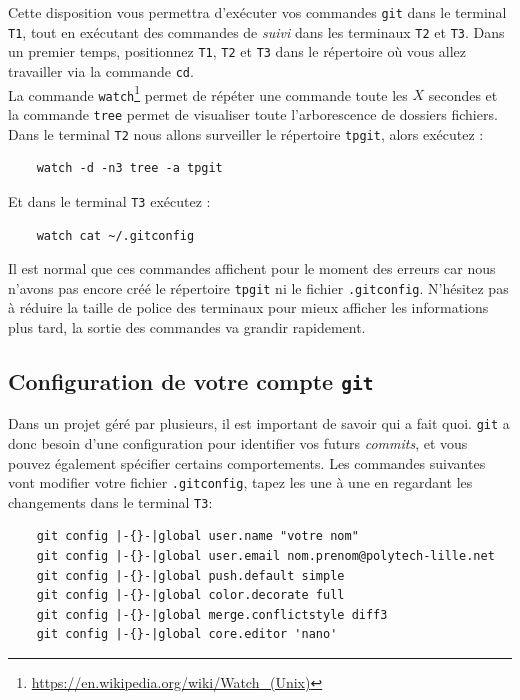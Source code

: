 \documentclass[final, a4paper, openbib, ]{article}
\begin{document}
Cette disposition vous permettra d'exécuter vos commandes \texttt{git} dans le terminal \texttt{T1}, tout en exécutant des commandes de \textit{suivi} dans les terminaux \texttt{T2} et \texttt{T3}.
Dans un premier temps, positionnez \texttt{T1}, \texttt{T2} et \texttt{T3} dans le répertoire où vous allez travailler via la commande \texttt{cd}.\\

La commande \texttt{watch}\footnote{\url{https://en.wikipedia.org/wiki/Watch\_(Unix)}} permet de répéter une commande toute les $X$ secondes et la commande \texttt{tree} permet de visualiser toute l'arborescence de dossiers fichiers. Dans le terminal \texttt{T2} nous allons surveiller le répertoire \texttt{tpgit}, alors exécutez :
\begin{verbatim}
	watch -d -n3 tree -a tpgit
\end{verbatim}

Et dans le terminal \texttt{T3} exécutez :
\begin{verbatim}
	watch cat ~/.gitconfig
\end{verbatim}

Il est normal que ces commandes affichent pour le moment des erreurs car nous n'avons pas encore créé le répertoire \texttt{tpgit} ni le fichier \texttt{.gitconfig}. N'hésitez pas à réduire la taille de police des terminaux pour mieux afficher les informations plus tard, la sortie des commandes va grandir rapidement.


\subsection{Configuration de votre compte \texttt{git}}

Dans un projet géré par plusieurs, il est important de savoir qui a fait quoi. \texttt{git} a donc besoin d'une configuration pour identifier vos futurs \textit{commits}, et vous pouvez également spécifier certains comportements.
Les commandes suivantes vont modifier votre fichier \texttt{.gitconfig}, tapez les une à une en regardant les changements dans le terminal \texttt{T3}:

\begin{verbatim}
	git config |-{}-|global user.name "votre nom"
	git config |-{}-|global user.email nom.prenom@polytech-lille.net
	git config |-{}-|global push.default simple
	git config |-{}-|global color.decorate full
	git config |-{}-|global merge.conflictstyle diff3
	git config |-{}-|global core.editor 'nano'
\end{verbatim}
\end{document}
